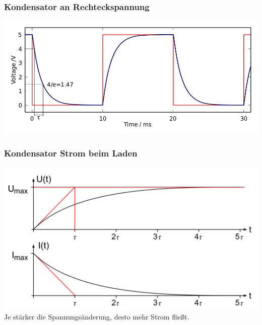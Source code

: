 \begin{frame}
    \frametitle{Kondensator an Rechteckspannung}
	\begin{center}
        \includegraphics[width=1\textwidth,height=.85\textheight,keepaspectratio]{a03/Capacitor_Square_wave_charge-discharge.png}
                \tiny \hyperlink{refs}{\cite{wc}}
    \end{center}
\end{frame}

\begin{frame}
    \frametitle{Kondensator Strom beim Laden}
	\begin{center}
        \includegraphics[width=1\textwidth,height=.75\textheight,keepaspectratio]{a03/Ladevorgang.png}
                \tiny \hyperlink{refs}{\cite{wc}}\\
        \Large{Je stärker die Spannungsänderung, desto mehr Strom fließt.}
    \end{center}
\end{frame}

